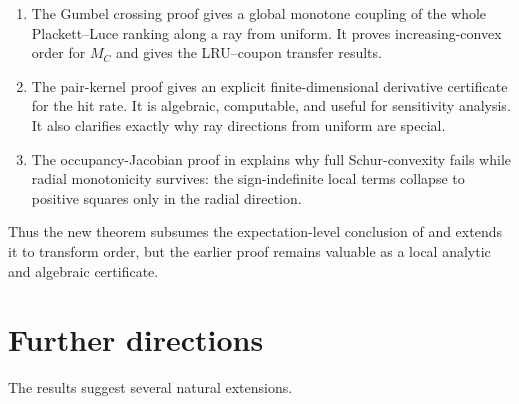 \documentclass[11pt]{article}
\newcommand{\1}{\mathbf 1}
\begin{document}
\begin{enumerate}[label=(\arabic*)]
\item The Gumbel crossing proof gives a global monotone coupling of the whole
Plackett--Luce ranking along a ray from uniform.  It proves increasing-convex order for
$M_C$ and gives the LRU--coupon transfer results.

\item The pair-kernel proof gives an explicit finite-dimensional derivative certificate
for the hit rate.  It is algebraic, computable, and useful for sensitivity analysis.
It also clarifies exactly why ray directions from uniform are special.

\item The occupancy-Jacobian proof in \cite{LongLRU2026} explains why full
Schur-convexity fails while radial monotonicity survives: the sign-indefinite local terms
collapse to positive squares only in the radial direction.
\end{enumerate}

Thus the new theorem subsumes the expectation-level conclusion of \cite{LongLRU2026} and
extends it to transform order, but the earlier proof remains valuable as a local analytic
and algebraic certificate.

\section{Further directions}

The results suggest several natural extensions.
\end{document}
